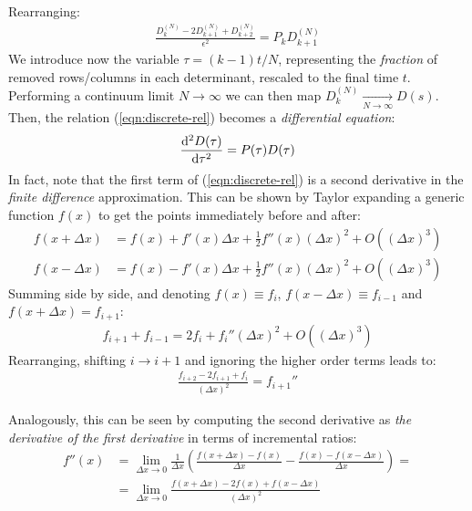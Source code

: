 \documentclass[../template.tex]{subfiles}
\begin{document}
Rearranging:
\begin{align}
    \frac{D_k^{(N)} - 2 D_{k+1}^{(N)} + D_{k+2}^{(N)}}{\epsilon^2} = P_k D_{k+1}^{(N)} 
    \label{eqn:discrete-rel}
\end{align}
We introduce now the variable $\tau = (k-1)t/N$, representing the \textit{fraction} of removed rows/columns in each determinant, rescaled to the final time $t$. Performing a continuum limit $N \to \infty$ we can then map $D_k^{(N)}  \xrightarrow[N \to \infty]{}  D(s)$. Then, the relation (\ref{eqn:discrete-rel}) becomes a \textit{differential equation}: 
\begin{align}
    \dv[2]{D(\tau)}{\tau} = P(\tau) D(\tau)
    \label{eqn:detdiffeq}
\end{align}
In fact, note that the first term of (\ref{eqn:discrete-rel}) is a second derivative in the \textit{finite difference} approximation. This can be shown by Taylor expanding a generic function $f(x)$ to get the points immediately before and after:
\begin{align*}
    f(x+ \Delta x) &= f(x) + f'(x) \Delta x + \frac{1}{2} f''(x) (\Delta x)^2  + O((\Delta x)^3)\\ 
    f(x- \Delta x) &= f(x) - f'(x) \Delta x + \frac{1}{2} f''(x) (\Delta x)^2 + O((\Delta x)^3)  
\end{align*} 
Summing side by side, and denoting $f(x) \equiv f_i$, $f(x-\Delta x) \equiv f_{i-1}$ and $f(x+ \Delta x) = f_{i+1}$:
\begin{align*}
    f_{i+1} + f_{i-1} = 2 f_i + f_i'' (\Delta x)^2 + O((\Delta x)^3)
\end{align*}   
Rearranging, shifting $i \to i+1$ and ignoring the higher order terms leads to:
\begin{align*}
    \frac{f_{i+2} - 2f_{i+1} + f_i}{(\Delta x)^2} = f_{i+1}'' 
\end{align*}

\begin{expl}
    Analogously, this can be seen by computing the second derivative as \textit{the derivative of the first derivative} in terms of incremental ratios:
    \begin{align*}
        f''(x) &= \lim_{\Delta x \to 0} \frac{1}{\Delta x} \left(\frac{f(x+\Delta x) - f(x)}{\Delta x} - \frac{f(x)-f(x - \Delta x)}{\Delta x }  \right) =\\
        &= \lim_{\Delta x \to 0} \frac{f(x+ \Delta x) - 2 f(x) + f(x- \Delta x)}{(\Delta x)^2} 
    \end{align*} 
\end{expl}
\end{document}
